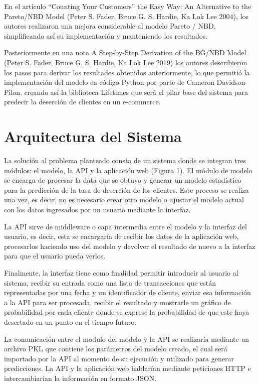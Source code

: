 	En el artículo “Counting Your Customers” the Easy Way: An Alternative to the Pareto/NBD Model (Peter S. Fader, Bruce G. S. Hardie, Ka Lok Lee 2004), los autores realizaron una mejora considerable al modelo Pareto / NBD, simplificando así su implementación y manteniendo los resultados.

	Posteriormente en una nota A Step-by-Step Derivation of the BG/NBD Model (Peter S. Fader, Bruce G. S. Hardie, Ka Lok Lee 2019) los autores describieron los pasos para derivar los resultados obtenidos anteriormente, lo que permitió la implementación del modelo en código Python por parte de Cameron Davidson-Pilon, creando así la biblioteca Lifetimes que será el pilar base del sistema para predecir la deserción de clientes en un e-commerce.

\section{Arquitectura del Sistema}

La solución al problema planteado consta de un sistema donde se integran tres módulos: el modelo, la API y la aplicación web (Figura 1). El módulo de modelo se encarga de procesar la data que se obtuvo y generar un modelo estadístico para la predicción de la tasa de deserción de los clientes. Este proceso se realiza una vez, es decir, no es necesario crear otro modelo o ajustar el modelo actual con los datos ingresados por un usuario mediante la interfaz.

	La API sirve de middleware o capa intermedia entre el modelo y la interfaz del usuario, es decir, esta se encargaría de recibir los datos de la aplicación web, procesarlos haciendo uso del modelo y devolver el resultado de nuevo a la interfaz para que el usuario pueda verlos.

	Finalmente, la interfaz tiene como finalidad permitir introducir al usuario al sistema, recibir su entrada como una lista de transacciones que están representadas por una fecha y un identificador de cliente, enviar esa información a la API para ser procesada, recibir el resultado y mostrarle un gráfico de probabilidad por cada cliente donde se exprese la probabilidad de que este haya desertado en un punto en el tiempo futuro.
	
	La comunicación entre el modulo del modelo y la API se realizaría mediante un archivo PKL que contiene los parámetros del modelo creado, el cual será importado por la API al momento de su ejecución y utilizado para generar predicciones. La API y la aplicación web hablarían mediante peticiones HTTP e intercambiarían la información en formato JSON.

